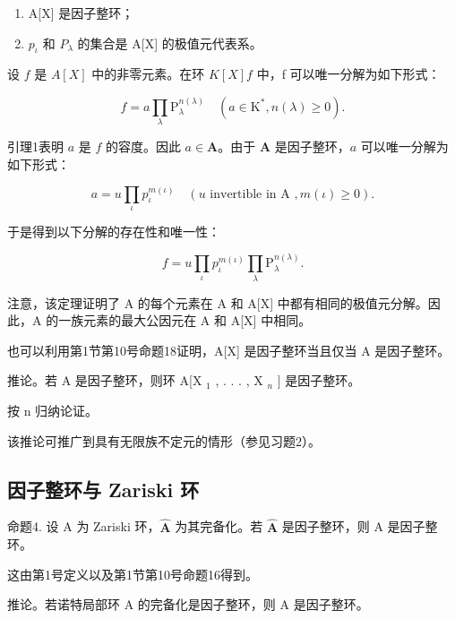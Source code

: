 \begin{enumerate}
\def\labelenumi{(\roman{enumi})}
\item
  A{[}X{]} 是因子整环；
\item
  \(p_{\iota}\) 和 \(P_{\lambda}\) 的集合是 A{[}X{]} 的极值元代表系。
\end{enumerate}

设 \(f\) 是 \(A[X]\) 中的非零元素。在环 \(K[X]f\) 中，f 可以唯一分解为如下形式：

\[
f = a \prod_ {\lambda} \mathrm{P} _ {\lambda} ^ {n (\lambda)} \quad (a \in \mathrm{K} ^ {*}, n (\lambda) \geqslant 0).
\]

引理1表明 \(a\) 是 \(f\) 的容度。因此 \(a \in \mathbf{A}\)。由于 \(\mathbf{A}\) 是因子整环，\(a\) 可以唯一分解为如下形式：

\[
a = u \prod_ {\iota} p _ {\iota} ^ {m (\iota)} \quad (u \text {   invertible   in   A }, m (\iota) \geqslant 0).
\]

于是得到以下分解的存在性和唯一性：

\[
f = u \prod_ {\iota} p _ {\iota} ^ {m (\iota)} \prod_ {\lambda} \mathrm{P} _ {\lambda} ^ {n (\lambda)}.
\]

注意，该定理证明了 A 的每个元素在 A 和 A{[}X{]} 中都有相同的极值元分解。因此，A 的一族元素的最大公因元在 A 和 A{[}X{]} 中相同。

也可以利用第1节第10号命题18证明，A{[}X{]} 是因子整环当且仅当 A 是因子整环。

推论。若 A 是因子整环，则环 A{[}X \(_{1}\) , . . . , X \(_{n}\) {]} 是因子整环。

按 n 归纳论证。

该推论可推广到具有无限族不定元的情形（参见习题2）。

\subsection{因子整环与 Zariski 环}

命题4. 设 A 为 Zariski 环，\(\hat{\mathbf{A}}\) 为其完备化。若 \(\hat{\mathbf{A}}\) 是因子整环，则 A 是因子整环。

这由第1号定义以及第1节第10号命题16得到。

推论。若诺特局部环 A 的完备化是因子整环，则 A 是因子整环。
